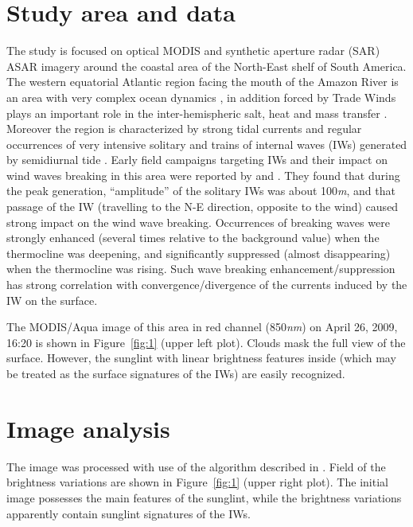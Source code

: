 \documentclass[preprint,authoryear,12pt]{elsarticle}
\begin{document}
\section{Study area and data}

The study is focused on optical MODIS and synthetic aperture radar (SAR) ASAR imagery around the coastal area of the North-East shelf of South America. The western equatorial Atlantic region facing the mouth of the Amazon River is an area with very complex ocean dynamics \citep{Silva2010}, in addition forced by Trade Winds \citep{Augustinus2004} plays an important role in the inter-hemispheric salt, heat and mass transfer \citep{Dengler2004, Schmitz1993}. Moreover the region is characterized by strong tidal currents \citep{Oltman1968, RockwellGeyer1996, LeBars2010} and regular occurrences of very intensive solitary and trains of internal waves (IWs) generated by semidiurnal tide \citep{Burdyugov1987, Ivanov1993}. Early field campaigns targeting IWs and their impact on wind waves breaking in this area were reported by \cite{Dulov1986}  and \cite{Burdyugov1987}. They found that during the peak generation, ``amplitude'' of the solitary IWs was about 100\textit{m}, and that passage of the IW (travelling to the N-E direction, opposite to the wind) caused strong impact on the wind wave breaking.  Occurrences of breaking waves were strongly enhanced (several times relative to the background value) when the thermocline was deepening, and significantly suppressed (almost disappearing) when the thermocline was rising. Such wave breaking enhancement/suppression has strong correlation with convergence/divergence of the currents induced by the IW on the surface.

The MODIS/Aqua image of this area in red channel (850\textit{nm}) on April 26, 2009, 16:20 is shown in Figure~\ref{fig:1} (upper left plot). Clouds mask the full view of the surface. However, the sunglint with linear brightness features inside (which may be treated as the surface signatures of the IWs) are easily recognized.


\section{Image analysis}

The image was processed with use of the algorithm described in \citep{Kudryavtsev2012a}. Field of the brightness variations  are shown in Figure~\ref{fig:1} (upper right plot). The initial image possesses the main features of the sunglint, while the brightness variations apparently contain sunglint signatures of the IWs.
\end{document}
